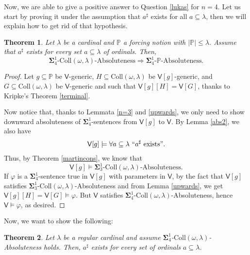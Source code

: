 \documentclass[10pt]{amsart}
\renewcommand\le\leqslant
\newtheorem{theorem}{Theorem}[section]
\theoremstyle{definition}
\begin{document}
Now, we are able to give a positive answer to Question \ref{lukas} for $n=4$. Let us start by proving it under the assumption that $a^\sharp$ exists for all $a\subseteq\lambda$, then we will explain how to get rid of that hypothesis.

\begin{theorem}\label{main-1}
    Let $\lambda$ be a cardinal and $\mathbb P$ a forcing notion with $|\mathbb P|\le\lambda$. Assume that $a^\sharp$ exists for every set $a\subseteq\lambda$ of ordinals. Then,
    \[\boldsymbol\Sigma^1_{4}\text{-}\mathrm{Coll}(\omega,\lambda)\text{-Absoluteness} \Rightarrow \boldsymbol\Sigma^1_{4}\text{-}\mathbb P\text{-Absoluteness}.\]
\end{theorem}

\begin{proof}
    Let $g\subseteq\mathbb P$ be $\mathsf V$-generic, $H\subseteq\mathrm{Coll}(\omega,\lambda)$ be $\mathsf V[g]$-generic, and $G\subseteq\mathrm{Coll}(\omega,\lambda)$ be $\mathsf V$-generic and such that $\mathsf V[g][H]=\mathsf V[G]$, thanks to Kripke's Theorem \ref{terminal}.\medskip

Now notice that, thanks to Lemmata \ref{n=3} and \ref{upwards}, we only need to show downward absoluteness of $\boldsymbol\Sigma^1_4$-sentences from $\mathsf V[g]$ to $\mathsf V$. By Lemma \ref{abs2}, we also have
\[\mathsf V[g] \models \forall a\subseteq\lambda\ ``a^\sharp\ \text{exists}".\]
Thus, by Theorem \ref{martincons}, we know that \[\mathsf V[g]\models\boldsymbol\Sigma^1_3\text{-}\mathrm{Coll}(\omega,\lambda)\text{-Absoluteness.}\]
If $\varphi$ is a $\boldsymbol\Sigma^1_4$-sentence true in $\mathsf V[g]$ with parameters in $\mathsf V$, by the fact that $\mathsf V[g]$ satisfies $\boldsymbol\Sigma^1_3$-$\mathrm{Coll}(\omega,\lambda)$-Absoluteness and from Lemma \ref{upwards}, we get $\mathsf V[g][H]=\mathsf V[G]\models\varphi$. But $\mathsf V$ satisfies $\boldsymbol\Sigma^1_4$-$\mathrm{Coll}(\omega,\lambda)$-Absoluteness, hence $\mathsf V\models\varphi$, as desired.
\end{proof}

Now, we want to show the following:

\begin{theorem}\label{n=4}
    Let $\lambda$ be a regular cardinal and assume $\boldsymbol\Sigma^1_4$-$\mathrm{Coll}(\omega,\lambda)$-Absoluteness holds. Then, $a^\sharp$ exists for every set of ordinals $a\subseteq\lambda$.
\end{theorem}
\end{document}
